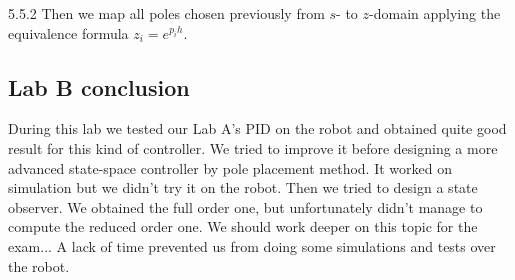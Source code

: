 \documentclass[11pt]{article}
\begin{document}
5.5.2 Then we map all poles chosen previously from $s$- to $z$-domain applying the equivalence formula $z_i=e^{p_ih}$.


\subsection*{Lab B conclusion}
During this lab we tested our Lab A's PID on the robot and obtained quite good result for this kind of controller. We tried to improve it before designing a more advanced state-space controller by pole placement method. It worked on simulation but we didn't try it on the robot. Then we tried to design a state observer. We obtained the full order one, but unfortunately didn't manage to compute the reduced order one. We should work deeper on this topic for the exam...
A lack of time prevented us from doing some simulations and tests over the robot.
\end{document}
